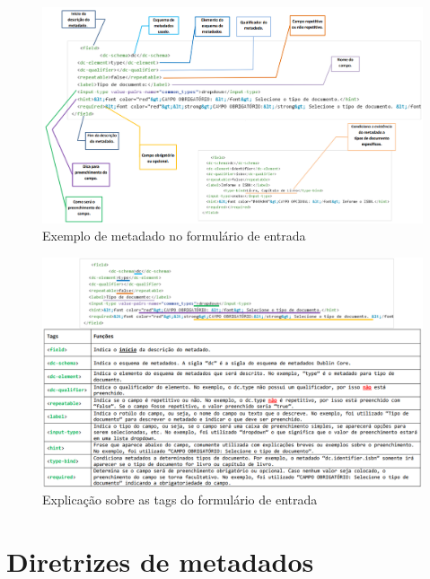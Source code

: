 \documentclass[12pt,hidelinks]{article}
\begin{document}
\newpage

    \begin{figure}[!htp]
                \centering
                \includegraphics[scale=0.5]{figura/Figura181.png}
                \caption{Exemplo de metadado no formulário de entrada}
            \label{Rotulo}
        \end{figure}
    
    \begin{figure}[!htp]
                \centering
                \includegraphics[scale=0.5]{figura/Figura182.png}
                \caption{Explicação sobre as tags do formulário de entrada}
            \label{Rotulo}
        \end{figure}

\newpage

\section{Diretrizes de metadados}

\newpage
    
\end{document}

